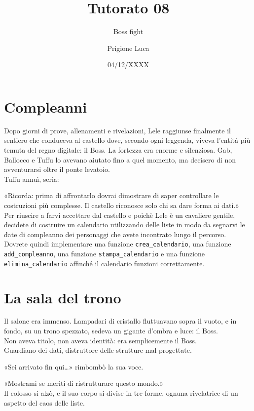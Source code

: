 \documentclass[a4paper]{article}
\title{Tutorato 08}
\subtitle{Boss fight}
\author{Prigione Luca}
\date{04/12/XXXX}
\begin{document}
\pagestyle{empty}

\maketitle

\section*{Compleanni}
Dopo giorni di prove, allenamenti e rivelazioni, Lele raggiunse finalmente il sentiero che conduceva al castello dove, secondo ogni leggenda, viveva l’entità più temuta del regno digitale: il Boss.
La fortezza era enorme e silenziosa. Gab, Ballocco e Tuffu lo avevano aiutato fino a quel momento, ma decisero di non avventurarsi oltre il ponte levatoio.\\
Tuffu annuì, seria:

«Ricorda: prima di affrontarlo dovrai dimostrare di saper controllare le costruzioni più complesse. Il castello riconosce solo chi sa dare forma ai dati.»\\
Per riuscire a farvi accettare dal castello e poichè Lele è un cavaliere gentile, decidete di costruire un calendario utilizzando delle liste in modo da segnarvi le date di compleanno dei personaggi che avete incontrato lungo il percorso.\\
Dovrete quindi implementare una funzione \texttt{crea\_calendario}, una funzione \texttt{add\_compleanno}, una funzione \texttt{stampa\_calendario} e una funzione \texttt{elimina\_calendario} affinché il calendario funzioni correttamente.

\section*{La sala del trono}
Il salone era immenso. Lampadari di cristallo fluttuavano sopra il vuoto, e in fondo, su un trono spezzato, sedeva un gigante d’ombra e luce: il Boss.\\
Non aveva titolo, non aveva identità: era semplicemente il Boss.\\
Guardiano dei dati, distruttore delle strutture mal progettate.

«Sei arrivato fin qui…» rimbombò la sua voce.

«Mostrami se meriti di ristrutturare questo mondo.»\\
Il colosso si alzò, e il suo corpo si divise in tre forme, ognuna rivelatrice di un aspetto del caos delle liste.
\end{document}
